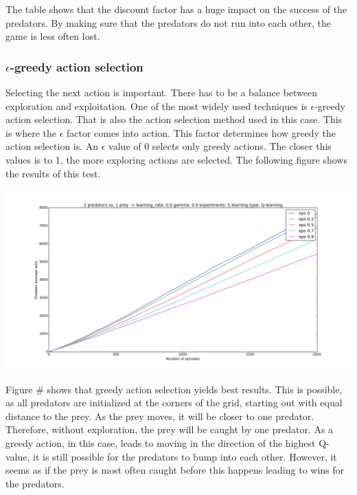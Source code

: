 The table shows that the discount factor has a huge impact on the success of the predators. By making sure that the predators do not run into each other, the game is less often lost.

\subsubsection{$\epsilon$-greedy action selection}
Selecting the next action is important. There has to be a balance between exploration and exploitation. One of the most widely used techniques is $\epsilon$-greedy action selection. That is also the action selection method used in this case. This is where the $\epsilon$ factor comes into action. This factor determines how greedy the action selection is. An $\epsilon$ value of 0 selects only greedy actions. The closer this values is to 1, the more exploring actions are selected. The following figure shows the results of this test.

\begin{center}
	\includegraphics[scale=0.3]{2_predators_epsilon_q_learning}
\end{center}

Figure \# shows that greedy action selection yields best results. This is possible, as all predators are initialized at the corners of the grid, starting out with equal distance to the prey. As the prey moves, it will be closer to one predator. Therefore, without exploration, the prey will be caught by one predator. As a greedy action, in this case, leads to moving in the direction of the highest Q-value, it is still possible for the predators to bump into each other. However, it seems as if the prey is most often caught before this happens leading to wins for the predators.

